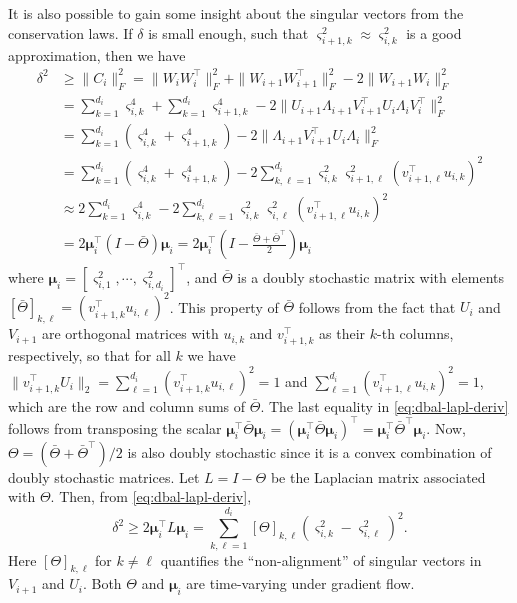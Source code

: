 \documentclass{article}
\newcommand{\1}{\mathds{1}}
\begin{document}
It is also possible to gain some insight about the singular vectors from the conservation laws. 
If $ \delta $ is small enough, such that $ \varsigma_{i+1,k}^2 \approx \varsigma_{i,k}^2 $ is a good approximation, then we have
\begin{align}
    \delta^2 & \geq \| C_{i} \|_F^2 = \| W_i W_i^\top \|_F^2 + \| W_{i+1} W_{i+1} ^\top \|_F^2 - 2 \| W_{i+1} W_i \|_F^2 \nonumber \\
    & = \sum_{k=1}^{d_i} \varsigma_{i,k}^4  + \sum_{k=1}^{d_i} \varsigma_{i+1,k}^4 - 2 \| U_{i+1} \Lambda_{i+1} V_{i+1}^\top U_i \Lambda_i V_i^\top  \|_F^2  \nonumber \\
    & = \sum_{k=1}^{d_i} ( \varsigma_{i,k}^4  + \varsigma_{i+1,k}^4 )  - 2 \| \Lambda_{i+1} V_{i+1}^\top U_i \Lambda_i  \|_F^2 \nonumber \\
    & = \sum_{k=1}^{d_i} ( \varsigma_{i,k}^4  + \varsigma_{i+1,k}^4 ) - 2 \sum_{k,\ell=1}^{d_i} \varsigma_{i,k}^2 \varsigma_{i+1,\ell}^2 (v_{i+1,\ell}^\top u_{i,k})^2 \nonumber \\
    & \approx 2 \sum_{k=1}^{d_i} \varsigma_{i,k}^4 - 2 \sum_{k,\ell=1}^{d_i} \varsigma_{i,k}^2 \varsigma_{i,\ell}^2 (v_{i+1,\ell}^\top u_{i,k})^2 \nonumber \\
    & = 2 \boldsymbol{\mu}_i^\top ( I - \bar{\Theta} ) \boldsymbol{\mu}_i = 2 \boldsymbol{\mu}_i^\top \left( I - \frac{\bar{\Theta} + \bar{\Theta}^\top}{2} \right) \boldsymbol{\mu}_i \label{eq:dbal-lapl-deriv}
\end{align}
where $ \boldsymbol{\mu}_i = [ \varsigma_{i,1}^2 , \cdots , \varsigma_{i,d_i}^2 ]^\top $, and $ \bar{\Theta} $ is a doubly stochastic matrix with elements $ [\bar{\Theta}]_{k,\ell} = (v_{i+1,k}^\top u_{i,\ell})^2 $. This property of $ \bar{\Theta} $ follows from the fact that $ U_i $ and $ V_{i+1} $ are orthogonal matrices with $ u_{i,k} $ and $ v_{i+1,k}^\top $ as their $ k $-th columns, respectively, so that for all $ k $ we have $ \| v_{i+1,k}^\top U_i \|_2 = \sum_{\ell = 1}^{d_i} (v_{i+1,k}^\top u_{i,\ell})^2 = 1 $ and $ \sum_{\ell = 1}^{d_i} (v_{i+1,\ell}^\top u_{i,k})^2 = 1 $, which are the row and column sums of $ \bar{\Theta} $. The last equality in \eqref{eq:dbal-lapl-deriv} follows from transposing the scalar $ \boldsymbol{\mu}_i^\top \bar{\Theta} \boldsymbol{\mu}_i = (\boldsymbol{\mu}_i^\top \bar{\Theta} \boldsymbol{\mu}_i)^\top = \boldsymbol{\mu}_i^\top \bar{\Theta}^\top \boldsymbol{\mu}_i $. Now, $ \Theta = ( \bar{\Theta} + \bar{\Theta}^\top ) / 2 $ is also doubly stochastic since it is a convex combination of doubly stochastic matrices. Let $ L = I - \Theta $ be the Laplacian matrix associated with $ \Theta $. Then, from \eqref{eq:dbal-lapl-deriv},
\begin{equation}
    \delta^2 \geq 2\boldsymbol{\mu}_i^\top L \boldsymbol{\mu}_i = \sum\limits_{k,\ell=1}^{d_i} [\Theta]_{k,\ell} (\varsigma_{i,k}^2 - \varsigma_{i,\ell}^2 )^2. \label{eq:dbal-laplacian}
\end{equation}
Here $ [\Theta]_{k,\ell} $ for $ k \neq \ell $ quantifies the ``non-alignment'' of singular vectors in $ V_{i+1} $ and $ U_i $.
Both $ \Theta $ and $ \boldsymbol{\mu}_i $ are time-varying under gradient flow. 
\end{document}
